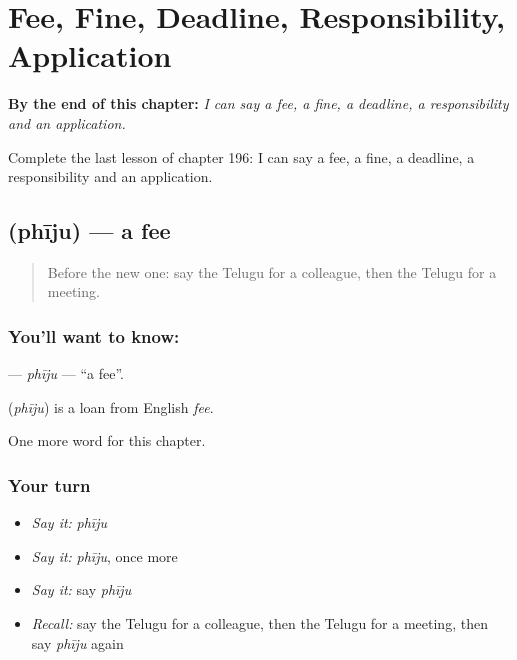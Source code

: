 
\chapter{Fee, Fine, Deadline, Responsibility, Application}
\label{ch:te-fee-fine-deadline-responsibility-application}

\begin{chapteropening}
\textbf{By the end of this chapter:} \emph{I can say a fee, a fine, a deadline, a responsibility and an application.}

Complete the last lesson of chapter 196: I can say a fee, a fine, a deadline, a responsibility and an application.
\end{chapteropening}

\section[\texorpdfstring{\te{ఫీజు} (phīju)}{ఫీజు (phīju)}]{ (phīju) — a fee}

\label{lesson:TE-C196-phiju}



\begin{quote}
Before the new one: say the Telugu for a colleague, then the Telugu for a meeting.
\end{quote}

\subsection*{You'll want to know: }
\textbf{} — \emph{phīju} — \textquotedblleft{}a fee\textquotedblright{}.

\begin{cousinweb}
\textbf{} (\emph{phīju}) is a loan from English \emph{fee}.
\end{cousinweb}

\begin{grammarlens}[title={What you've built}]
One more word for this chapter.
\end{grammarlens}

\subsection*{Your turn}
\begin{itemize}
\raggedright
  \item \emph{Say it:} \emph{phīju}
  \item \emph{Say it:} \emph{phīju}, once more
  \item \emph{Say it:} say \emph{phīju}
  \item \emph{Recall:} say the Telugu for a colleague, then the Telugu for a meeting, then say \emph{phīju} again
\end{itemize}

